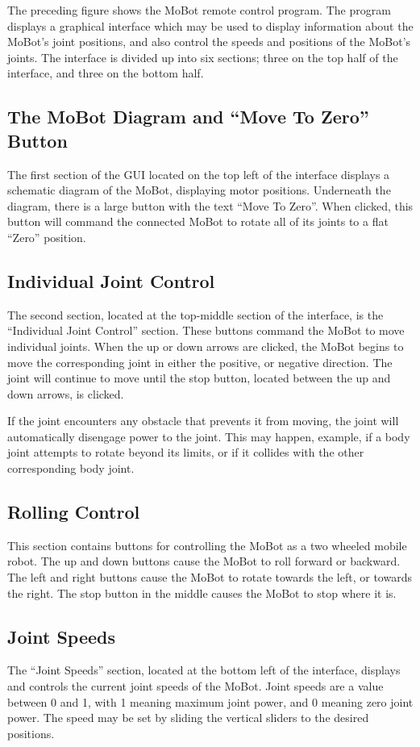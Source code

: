 \documentclass{article}
\begin{document}
The preceding figure shows the MoBot remote control program. The
program displays a graphical interface which may be used to display
information about the MoBot's joint positions, and also control the
speeds and positions of the MoBot's joints. The interface is divided
up into six sections; three on the top half of the interface, and three on 
the bottom half. 

\subsection{The MoBot Diagram and ``Move To Zero'' Button}
The first section of the GUI located on the top left of the interface
displays a schematic diagram of the MoBot, displaying motor positions.
Underneath the diagram, there is a large button with the text 
``Move To Zero''. When clicked, this button will command the connected
MoBot to rotate all of its joints to a flat ``Zero'' position.

\subsection{Individual Joint Control}
The second section, located at the top-middle section of the interface,
is the ``Individual Joint Control'' section. These buttons command the
MoBot to move individual joints. When the up or down arrows are clicked,
the MoBot begins to move the corresponding joint in either the positive,
or negative direction. The joint will continue to move until the stop 
button, located between the up and down arrows, is clicked. 

If the joint encounters any obstacle that prevents it from moving, the 
joint will automatically disengage power to the joint. This may happen, 
example, if a body joint attempts to rotate beyond its limits,
or if it collides with the other corresponding body joint. 

\subsection{Rolling Control}
This section contains buttons for controlling the MoBot as a 
two wheeled mobile robot. The up and down buttons cause the MoBot to
roll forward or backward. The left and right buttons cause the MoBot 
to rotate towards the left, or towards the right. The stop button in the
middle causes the MoBot to stop where it is.

\subsection{Joint Speeds}
The ``Joint Speeds'' section, located at the bottom left of the interface,
displays and controls the current joint speeds of the MoBot. Joint speeds
are a value between 0 and 1, with 1 meaning maximum joint power, and 0
meaning zero joint power. The speed may be set by sliding the vertical 
sliders to the desired positions. 
\end{document}

